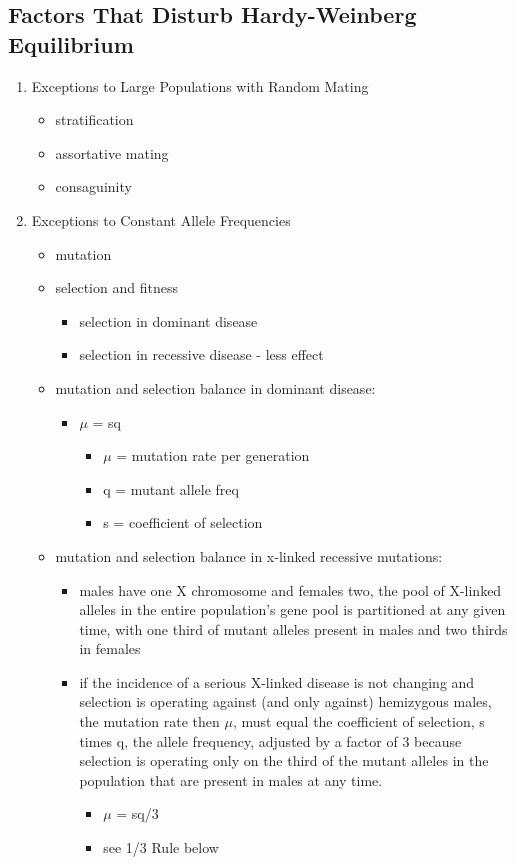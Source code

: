 \documentclass[12pt]{scrartcl}
\begin{document}
\subsection{Factors That Disturb Hardy-Weinberg Equilibrium}
\label{sec:org7725117}
\begin{enumerate}
\item Exceptions to Large Populations with Random Mating
\label{sec:org1b0cdc3}
\begin{itemize}
\item stratification
\item assortative mating
\item consaguinity
\end{itemize}
\item Exceptions to Constant Allele Frequencies
\label{sec:orgb0fe225}
\begin{itemize}
\item mutation
\item selection and fitness
\begin{itemize}
\item selection in dominant disease
\item selection in recessive disease - less effect
\end{itemize}
\item mutation and selection balance in dominant disease:
\begin{itemize}
\item \(\mu\) = sq
\begin{itemize}
\item \(\mu\) = mutation rate per generation
\item q = mutant allele freq
\item s = coefficient of selection
\end{itemize}
\end{itemize}
\item mutation and selection balance in x-linked recessive mutations:
\begin{itemize}
\item males have one X chromosome and females two, the pool of X-linked
alleles in the entire population’s gene pool is partitioned at any
given time, with one third of mutant alleles present in males and
two thirds in females
\item if the incidence of a serious X-linked disease is not changing and
selection is operating against (and only against) hemizygous males,
the mutation rate then \(\mu\), must equal the coefficient of selection, s
times q, the allele frequency, adjusted by a factor of 3 because
selection is operating only on the third of the mutant alleles in
the population that are present in males at any time. 
\begin{itemize}
\item \(\mu\) = sq/3
\item see 1/3 Rule below
\end{itemize}
\end{itemize}
\end{itemize}
\end{enumerate}
\end{document}
